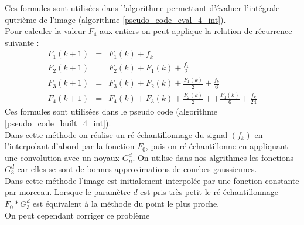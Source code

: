 Ces formules sont utilisées dans l'algorithme permettant d'évaluer l'intégrale qutrième de l'image (algorithme \ref{pseudo_code_eval_4_int}).\\
Pour calculer la valeur $F_4$ aux entiers on peut applique la relation de récurrence suivante :
\begin{eqnarray*}
F_{1}(k+1)&=&  F_{1}(k)+f_{k}  \\
F_{2}(k+1)&=&  F_{2}(k)+F_{1}(k)+\frac{f_{k}}{2}   \\
F_{3}(k+1)&=&  F_{3}(k)+F_{2}(k)+\frac{F_{1}(k)}{2}+\frac{f_{k}}{6}   \\
F_{4}(k+1)&=&  F_{4}(k)+F_{3}(k)+\frac{F_{2}(k)}{2}++\frac{F_{1}(k)}{6}+\frac{f_{k}}{24}  
\end{eqnarray*}
Ces formules sont utilisées dans le pseudo code (algorithme \ref{pseudo_code_built_4_int}).\\
Dans cette méthode on réalise un ré-échantillonnage du signal $(f_k)$ en l'interpolant d'abord par la fonction $F_{0}$, puis on ré-échantillonne en appliquant une convolution avec un noyaux $G_n^d$. On utilise dans nos algrithmes les fonctions $G_3^d$ car elles se sont de bonnes approximations de courbes gaussiennes.\\ %
Dans cette méthode l'image est initialement interpolée par une fonction constante par morceau. Lorsque le paramètre $d$ est pris très petit le ré-échantillonnage $F_{0}*G_3^d$ est équivalent à la méthode du point le plus proche.\\
On peut cependant corriger ce problème

